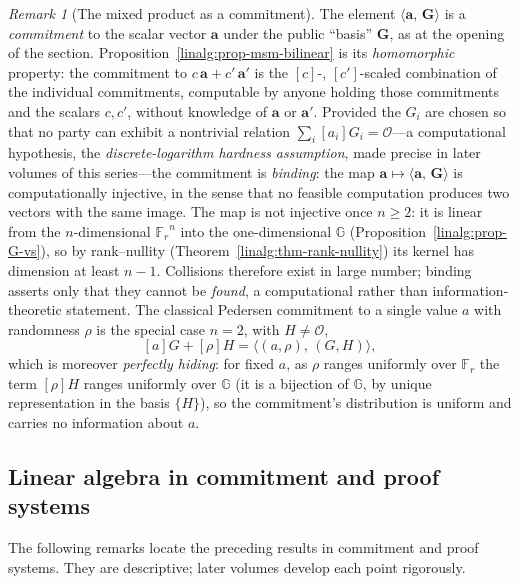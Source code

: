 \documentclass[11pt,a4paper]{article}
\theoremstyle{definition}
\theoremstyle{remark}
\newtheorem{remark}[theorem]{Remark}
\newcommand{\G}{\ensuremath{\mathbb{G}}}
\newcommand{\ip}[2]{\langle #1,\, #2 \rangle}
\newcommand{\Fr}{\ensuremath{\mathbb{F}_{r}}}
\begin{document}
\begin{remark}[The mixed product as a commitment]\label{linalg:rem-msm-meaning}
The element \(\ip{\mathbf a}{\mathbf G}\) is a \emph{commitment} to the
scalar vector \(\mathbf a\) under the public ``basis''
\(\mathbf G\), as at the opening of the section.
Proposition~\ref{linalg:prop-msm-bilinear} is its \emph{homomorphic}
property: the commitment
to \(c\,\mathbf a + c'\,\mathbf a'\) is the \([c]\)-, \([c']\)-scaled
combination of the individual commitments, computable by anyone holding
those commitments and the scalars \(c, c'\), without knowledge of
\(\mathbf a\) or \(\mathbf a'\). Provided the \(G_i\) are chosen so
that no party can exhibit a nontrivial relation
\(\sum_i [a_i] G_i = \mathcal O\)---a computational hypothesis, the
\emph{discrete-logarithm hardness assumption}, made precise in later
volumes of this series---the commitment is \emph{binding}: the map
\(\mathbf a \mapsto \ip{\mathbf a}{\mathbf G}\) is computationally
injective, in the sense that no feasible computation produces two
vectors with the same image. The map is not injective once
\(n \ge 2\): it is linear from the \(n\)-dimensional \(\Fr^n\)
into the one-dimensional \(\G\)
(Proposition~\ref{linalg:prop-G-vs}), so by rank--nullity
(Theorem~\ref{linalg:thm-rank-nullity}) its kernel has dimension at
least \(n - 1\). Collisions therefore exist in large number; binding
asserts only that they cannot be \emph{found}, a computational rather
than information-theoretic statement. The classical Pedersen commitment to a
single value \(a\) with randomness \(\rho\) is the special case
\(n = 2\), with \(H\neq\mathcal O\),
\[
[a]G + [\rho]H = \ip{(a, \rho)}{(G, H)} ,
\]
which is moreover \emph{perfectly hiding}: for fixed \(a\), as \(\rho\)
ranges uniformly over \(\Fr\) the term \([\rho]H\) ranges uniformly
over \(\G\) (it is a bijection of \(\G\), by unique representation in
the basis \(\{H\}\)), so the commitment's distribution is uniform and
carries no information about \(a\).
\end{remark}

\subsection{Linear algebra in commitment and proof systems}\label{linalg:subsec-crypto}

The following remarks locate the preceding results in commitment and
proof systems. They are descriptive; later volumes develop each point
rigorously.
\end{document}
